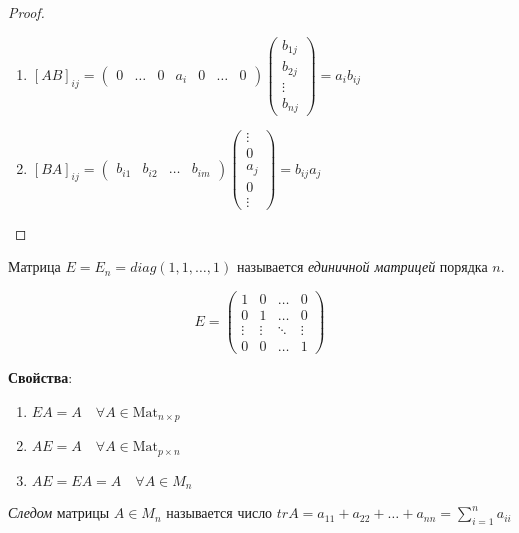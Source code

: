 \begin{proof}
    \begin{enumerate}
    \item $[AB]_{ij} = \begin{pmatrix} 0 & \dots & 0 & a_i & 0 & \dots & 0\end{pmatrix} \begin{pmatrix} b_{1j} \\ b_{2j} \\ \vdots \\ b_{nj} \end{pmatrix} = a_i b_{ij} $
    \item $[BA]_{ij} = \begin{pmatrix} b_{i1} & b_{i2} & \dots & b_{im} \end{pmatrix} \begin{pmatrix} \vdots \\ 0 \\ a_j \\ 0 \\ \vdots \end{pmatrix} = b_{ij} a_j$ 
    \end{enumerate}
\end{proof}

\begin{definition}
    Матрица $E = E_n = diag(1, 1, \dots, 1)$ называется \textit{единичной матрицей} порядка $n$. 

    \begin{equation*}
        E = \begin{pmatrix} 
            1 & 0 & \dots & 0 \\
            0 & 1 & \dots & 0 \\
            \vdots & \vdots & \ddots & \vdots \\
            0 & 0 & \dots & 1
        \end{pmatrix} 
    \end{equation*}
\end{definition}

\textbf{Свойства}:
\begin{enumerate}
    \item $EA = A \quad \forall A \in \text{Mat}_{n \times p}$
    \item $AE = A \quad \forall A \in \text{Mat}_{p \times n}$
    \item $AE = EA = A \quad \forall A \in M_n$
\end{enumerate}

\begin{definition}
    \textit{Следом} матрицы $A \in M_n$ называется число $trA = a_{11} + a_{22} + \dots + a_{nn} = \sum_{i=1}^n a_{ii}$ 
\end{definition}

